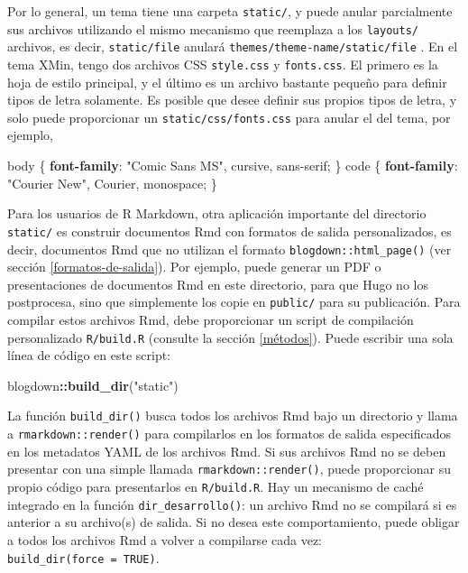 \documentclass[12pt,]{krantz}
\makeatletter
\newenvironment{Shaded}{\begin{snugshade}}{\end{snugshade}}
\newcommand{\DecValTok}[1]{\textcolor[rgb]{0.00,0.00,0.81}{#1}}
\newcommand{\KeywordTok}[1]{\textcolor[rgb]{0.13,0.29,0.53}{\textbf{#1}}}
\newcommand{\NormalTok}[1]{#1}
\newcommand{\OperatorTok}[1]{\textcolor[rgb]{0.81,0.36,0.00}{\textbf{#1}}}
\newcommand{\StringTok}[1]{\textcolor[rgb]{0.31,0.60,0.02}{#1}}
\newenvironment{kframe}{%
\medskip{}
\setlength{\fboxsep}{.8em}
 \def\at@end@of@kframe{}%
 \ifinner\ifhmode%
  \def\at@end@of@kframe{\end{minipage}}%
  \begin{minipage}{\columnwidth}%
 \fi\fi%
 \def\FrameCommand##1{\hskip\@totalleftmargin \hskip-\fboxsep
 \colorbox{shadecolor}{##1}\hskip-\fboxsep
     \hskip-\linewidth \hskip-\@totalleftmargin \hskip\columnwidth}%
 \MakeFramed {\advance\hsize-\width
   \@totalleftmargin\z@ \linewidth\hsize
   \@setminipage}}%
 {\par\unskip\endMakeFramed%
 \at@end@of@kframe}
\renewenvironment{Shaded}{\begin{kframe}}{\end{kframe}}
\theoremstyle{definition}
\theoremstyle{definition}
\theoremstyle{definition}
\theoremstyle{remark}
\makeatother
\begin{document}
Por lo general, un tema tiene una carpeta \texttt{static/}, y puede
anular parcialmente sus archivos utilizando el mismo mecanismo que
reemplaza a los \texttt{layouts/} archivos, es decir,
\texttt{static/file} anulará \texttt{themes/theme-name/static/file} . En
el tema XMin, tengo dos archivos CSS \texttt{style.css} y
\texttt{fonts.css}. El primero es la hoja de estilo principal, y el
último es un archivo bastante pequeño para definir tipos de letra
solamente. Es posible que desee definir sus propios tipos de letra, y
solo puede proporcionar un \texttt{static/css/fonts.css} para anular el
del tema, por ejemplo,

\begin{Shaded}
\begin{Highlighting}[]
\NormalTok{body \{}
  \KeywordTok{font-family}\NormalTok{: }\StringTok{"Comic Sans MS"}\NormalTok{, }\DecValTok{cursive}\NormalTok{, }\DecValTok{sans-serif}\NormalTok{;}
\NormalTok{\}}
\NormalTok{code \{}
  \KeywordTok{font-family}\NormalTok{: }\StringTok{"Courier New"}\NormalTok{, Courier, }\DecValTok{monospace}\NormalTok{;}
\NormalTok{\}}
\end{Highlighting}
\end{Shaded}

Para los usuarios de R Markdown, otra aplicación importante del
directorio \texttt{static/} es construir documentos Rmd con formatos de
salida personalizados, es decir, documentos Rmd que no utilizan el
formato \texttt{blogdown::html\_page()} (ver sección
\ref{formatos-de-salida}). Por ejemplo, puede generar un PDF o
presentaciones de documentos Rmd en este directorio, para que Hugo no
los postprocesa, sino que simplemente los copie en \texttt{public/} para
su publicación. Para compilar estos archivos Rmd, debe proporcionar un
script de compilación personalizado \texttt{R/build.R} (consulte la
sección \ref{métodos}). Puede escribir una sola línea de código en este
script:

\begin{Shaded}
\begin{Highlighting}[]
\NormalTok{blogdown}\OperatorTok{::}\KeywordTok{build_dir}\NormalTok{(}\StringTok{"static"}\NormalTok{)}
\end{Highlighting}
\end{Shaded}

La función \texttt{build\_dir()} busca todos los archivos Rmd bajo un
directorio y llama a \texttt{rmarkdown::render()} para compilarlos en
los formatos de salida especificados en los metadatos YAML de los
archivos Rmd. Si sus archivos Rmd no se deben presentar con una simple
llamada \texttt{rmarkdown::render()}, puede proporcionar su propio
código para presentarlos en \texttt{R/build.R}. Hay un mecanismo de
caché integrado en la función \texttt{dir\_desarrollo()}: un archivo Rmd
no se compilará si es anterior a su archivo(s) de salida. Si no desea
este comportamiento, puede obligar a todos los archivos Rmd a volver a
compilarse cada vez: \texttt{build\_dir(force\ =\ TRUE)}.
\end{document}
